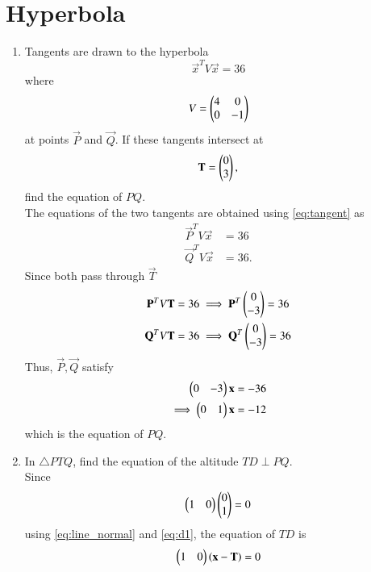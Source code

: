 \documentclass[journal,12pt,twocolumn]{IEEEtran}
\renewcommand\thesection{\arabic{section}}
\begin{document}
\section{Hyperbola}
\begin{enumerate}[label=\thesection.\arabic*
,ref=\thesection.\theenumi]
\item Tangents are drawn to the hyperbola 
\begin{equation}
\vec{x}^TV\vec{x} =36 
\label{eq:hyper}
\end{equation}
%
where
\begin{equation}
V = \begin{pmatrix}4 & 0 \\ 0 & -1\end{pmatrix}
\label{eq:hyperv}
\end{equation}
%
at points $\vec{P}$ and $\vec{Q}$.  If these tangents intersect at 
\begin{equation}
\mathbf{T}= \begin{pmatrix}0 \\ 3\end{pmatrix},
\end{equation}
%
find the equation of $PQ$.
\\
\solution The equations of the two tangents are obtained using \eqref{eq:tangent} as
\begin{align}
\vec{P}^TV\vec{x} &=36
\\
\vec{Q}^TV\vec{x}  &=36.
\end{align}		
%
Since both pass through $\vec{T}$
\begin{align}
\label{eq:hyperp}
\mathbf{P}^TV\mathbf{T}  &=36 \implies \mathbf{P}^T\begin{pmatrix}0  \\  -3\end{pmatrix} = 36
\\
\mathbf{Q}^TV\mathbf{T}  &=36 \implies \mathbf{Q}^T\begin{pmatrix}0  \\  -3\end{pmatrix} = 36
\label{eq:hyperq}
\end{align}
Thus, $\vec{P}, \vec{Q}$ satisfy
\begin{align}
\begin{pmatrix}0 &  -3\end{pmatrix}\mathbf{x} &= -36
\\
\implies \begin{pmatrix}0 &  1\end{pmatrix}\mathbf{x} &= -12
\label{eq:d1}
\end{align}
%
which is the equation of $PQ$.
\item In $\triangle PTQ$, find the equation of the altitude $TD \perp PQ$.
\\
\solution Since 
\begin{align}
 \begin{pmatrix}1 &  0\end{pmatrix} \begin{pmatrix}0 \\  1\end{pmatrix}=0
\end{align}
using \eqref{eq:line_normal} and \eqref{eq:d1},
the equation of $TD$ is
\begin{align}
\myvec{1 & 0}\brak{\vec{x}-\vec{T}} &= 0
\\

\end{align}
\end{enumerate}
\end{document}
